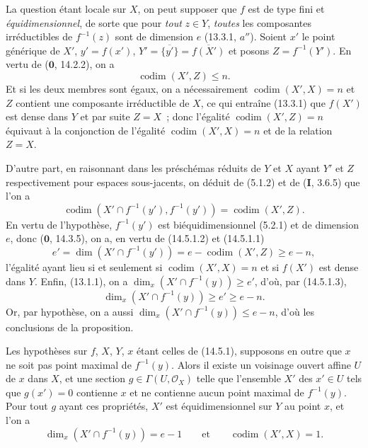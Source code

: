 La question étant locale sur $X$, on peut supposer que $f$ est de type fini et
\emph{équidimensionnel}, de sorte que pour \emph{tout} $z\in Y$, \emph{toutes} les
composantes irréductibles de $f^{-1}(z)$ sont de dimension $e$ (13.3.1, $a''$).
Soient $x'$ le point générique de $X'$, $y'=f(x')$,
$Y'=\overline{\{y'\}}=\overline{f(X')}$ et posons $Z=f^{-1}(Y')$. En vertu de
($\mathbf 0$, 14.2.2), on a
\begin{equation}
  \operatorname{codim}(X',Z)\leq n.
  \tag{14.5.1.1}\label{IV.14.5.1.1-fr}
\end{equation}
Et si les deux membres sont égaux, on a nécessairement $\operatorname{codim}(X',X)=n$ et $Z$
contient une composante irréductible de $X$, ce qui entraîne (13.3.1) que
$f(X')$ est dense dans $Y$ et par suite $Z=X$~; donc l'égalité
$\operatorname{codim}(X',Z)=n$ équivaut à la conjonction de l'égalité $\operatorname{codim}(X',X)=n$ et de
la relation $Z=X$.

D'autre part, en raisonnant dans les préschémas réduits de $Y$ et $X$ ayant $Y'$
et $Z$ respectivement pour espaces sous-jacents, on déduit de (5.1.2) et de
(\textbf{I}, 3.6.5) que l'on a
\begin{equation}
  \operatorname{codim}(X'\cap f^{-1}(y'),f^{-1}(y'))=\operatorname{codim}(X',Z).
  \tag{14.5.1.2}\label{IV.14.5.1.2-fr}
\end{equation}
En vertu de l'hypothèse, $f^{-1}(y')$ est biéquidimensionnel (5.2.1) et de
dimension $e$, donc ($\mathbf 0$, 14.3.5), on a, en vertu de (14.5.1.2) et
(14.5.1.1)
\begin{equation}
  e'=\dim(X'\cap f^{-1}(y'))=e-\operatorname{codim}(X',Z)\geq e-n,
  \tag{14.5.1.3}\label{IV.14.5.1.3-fr}
\end{equation}
l'égalité ayant lieu si et seulement si $\operatorname{codim}(X',X)=n$ et si $f(X')$ est dense
dans $Y$. Enfin, (13.1.1), on a $\dim_x(X'\cap f^{-1}(y))\geq e'$, d'où, par
(14.5.1.3),
\begin{equation}
  \dim_x(X'\cap f^{-1}(y))\geq e'\geq e-n.
  \tag{14.5.1.4}\label{IV.14.5.1.4-fr}
\end{equation}
Or, par hypothèse, on a aussi $\dim_x(X'\cap f^{-1}(y))\leq e-n$, d'où les
conclusions de la proposition.

\begin{corollary}[14.5.2]
\label{IV.14.5.2-fr}
Les hypothèses sur $f$, $X$, $Y$, $x$ étant celles de (14.5.1), supposons en
outre que $x$ ne soit pas point maximal de $f^{-1}(y)$. Alors il existe un
voisinage ouvert affine $U$ de $x$ dans $X$, et une section
$g\in\Gamma(U,\mathcal O_X)$ telle que l'ensemble $X'$ des $x'\in U$ tels que
$g(x')=0$ contienne $x$ et ne contienne aucun point maximal de $f^{-1}(y)$. Pour
tout $g$ ayant ces propriétés, $X'$ est équidimensionnel sur $Y$ au point $x$, et
l'on a
\begin{equation}
  \dim_x(X'\cap f^{-1}(y))=e-1 \qquad\text{et}\qquad \operatorname{codim}(X',X)=1.
  \tag{14.5.2.1}\label{IV.14.5.2.1-fr}
\end{equation}
\end{corollary}

